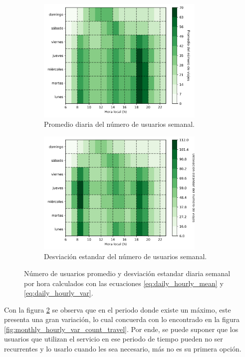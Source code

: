 \begin{figure}[H]
    \centering
    \begin{subfigure}[b]{8cm}
        \includegraphics[width=8cm]{Graphics/daily_hourly_mean_count_travel.png}
        \caption{Promedio diaria del número de usuarios semanal.}
        \label{fig:daily_hourly_mean_count_travel}
    \end{subfigure}
    \begin{subfigure}[b]{8cm}
        \includegraphics[width=8cm]{Graphics/daily_hourly_var_count_travel.png}
        \caption{Desviación estandar del número de usuarios semanal.}
        \label{fig:daily_hourly_var_count_travel}
    \end{subfigure}
    \caption{Número de usuarios promedio y desviación estandar diaria semanal por hora calculados con las ecuaciones \ref{eq:daily_hourly_mean} y \ref{eq:daily_hourly_var}.}
    \label{fig:daily_hourly_count_travel}
\end{figure}

Con la figura \ref{fig:daily_hourly_var_count_travel} se observa que en el periodo donde existe un máximo, este presenta una gran variación, lo cual concuerda con lo encontrado en la figura \ref{fig:monthly_hourly_var_count_travel}. Por ende, se puede suponer que los usuarios que utilizan el servicio en ese periodo de tiempo pueden no ser recurrentes y lo usarlo cuando les sea necesario, más no es su primera opción.

